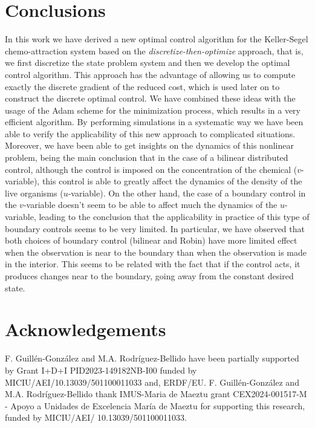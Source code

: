 \documentclass[11pt]{article}
\numberwithin{theorem}{section}
\begin{document}
\section{Conclusions}\label{sec:conclusions}

In this work we have derived a new optimal control algorithm for the Keller-Segel chemo-attraction system based on the \textit{discretize-then-optimize} approach, that is, we first discretize the state problem system and then we develop the optimal control algorithm. This approach has the advantage of allowing us to compute exactly the discrete gradient of the reduced cost, which is used later on to construct the discrete optimal control. We have combined these ideas with the usage of the Adam scheme for the minimization process, which results in a very efficient algorithm. By performing simulations in a systematic way we have been able to verify the applicability of this new approach to complicated situations. Moreover, we have been able to get insights on the dynamics of this nonlinear problem, being the main conclusion that in the case of a bilinear distributed control, although the control is imposed on the concentration of the chemical ($v$-variable), this control is able to greatly affect the dynamics of the density of the live organisms ($u$-variable). On the other hand, the case of a boundary control in the $v$-variable doesn't seem to be able to affect much the dynamics of the $u$-variable, leading to the conclusion that the applicability in practice of this type of boundary controls 
seems to be very limited. In particular, we have observed that  both  choices  of 
 boundary control (bilinear and Robin) have more limited effect  when the observation is near to the boundary than when the observation is made in the interior.  This seems to be related with the fact that if the control acts, it produces changes near to the boundary, going away from  the constant desired state.

\section*{Acknowledgements}
F. Guill\'en-Gonz\'alez and M.A. Rodr\'iguez-Bellido have been partially supported by Grant  I+D+I PID2023-149182NB-I00 funded by MICIU/AEI/10.13039/501100011033 and, ERDF/EU. F. Guill\'en-Gonz\'alez and M.A. Rodr\'iguez-Bellido thank IMUS-Maria de Maeztu grant CEX2024-001517-M - Apoyo a Unidades de Excelencia Mar\'ia de Maeztu for supporting this research, funded by MICIU/AEI/ 10.13039/501100011033.
\end{document}
